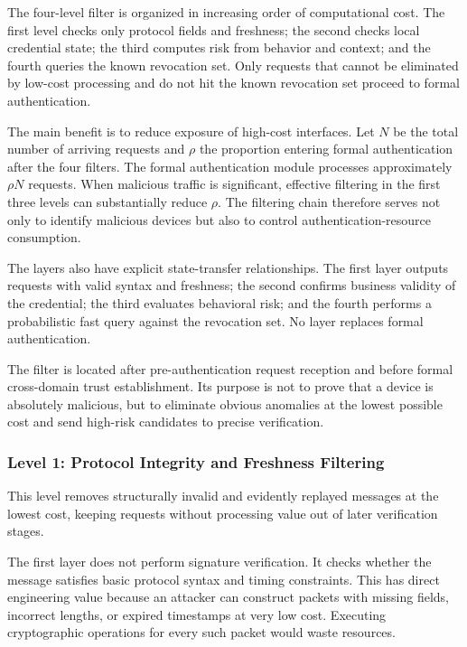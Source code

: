 \documentclass[lettersize,journal]{IEEEtran}
\begin{document}
	
	The four-level filter is organized in increasing order of computational cost. The first level checks only protocol fields and freshness; the second checks local credential state; the third computes risk from behavior and context; and the fourth queries the known revocation set. Only requests that cannot be eliminated by low-cost processing and do not hit the known revocation set proceed to formal authentication.
	
	The main benefit is to reduce exposure of high-cost interfaces. Let $N$ be the total number of arriving requests and $\rho$ the proportion entering formal authentication after the four filters. The formal authentication module processes approximately $\rho N$ requests. When malicious traffic is significant, effective filtering in the first three levels can substantially reduce $\rho$. The filtering chain therefore serves not only to identify malicious devices but also to control authentication-resource consumption.
	
	The layers also have explicit state-transfer relationships. The first layer outputs requests with valid syntax and freshness; the second confirms business validity of the credential; the third evaluates behavioral risk; and the fourth performs a probabilistic fast query against the revocation set. No layer replaces formal authentication.
	
	The filter is located after pre-authentication request reception and before formal cross-domain trust establishment. Its purpose is not to prove that a device is absolutely malicious, but to eliminate obvious anomalies at the lowest possible cost and send high-risk candidates to precise verification.
	
	\subsubsection{Level 1: Protocol Integrity and Freshness Filtering}
	This level removes structurally invalid and evidently replayed messages at the lowest cost, keeping requests without processing value out of later verification stages.
	
	
	The first layer does not perform signature verification. It checks whether the message satisfies basic protocol syntax and timing constraints. This has direct engineering value because an attacker can construct packets with missing fields, incorrect lengths, or expired timestamps at very low cost. Executing cryptographic operations for every such packet would waste resources.
	
\end{document}
